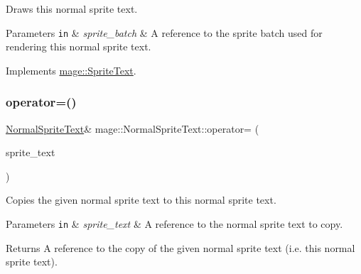 Draws this normal sprite text.


\begin{DoxyParams}[1]{Parameters}
\mbox{\tt in}  & {\em sprite\+\_\+batch} & A reference to the sprite batch used for rendering this normal sprite text. \\
\hline
\end{DoxyParams}


Implements \hyperlink{classmage_1_1_sprite_text_a45d5ac8410d5a46b26e8491946a2ad9e}{mage\+::\+Sprite\+Text}.

\hypertarget{classmage_1_1_normal_sprite_text_ab7dbd2e71dcaef5d6b7b767afa8d7094}{}\label{classmage_1_1_normal_sprite_text_ab7dbd2e71dcaef5d6b7b767afa8d7094} 
\subsubsection{\texorpdfstring{operator=()}{operator=()}\hspace{0.1cm}{\footnotesize\ttfamily [1/2]}}
{\footnotesize\ttfamily \hyperlink{classmage_1_1_normal_sprite_text}{Normal\+Sprite\+Text}\& mage\+::\+Normal\+Sprite\+Text\+::operator= (\begin{DoxyParamCaption}\item[{const \hyperlink{classmage_1_1_normal_sprite_text}{Normal\+Sprite\+Text} \&}]{sprite\+\_\+text }\end{DoxyParamCaption})\hspace{0.3cm}{\ttfamily [delete]}}

Copies the given normal sprite text to this normal sprite text.


\begin{DoxyParams}[1]{Parameters}
\mbox{\tt in}  & {\em sprite\+\_\+text} & A reference to the normal sprite text to copy. \\
\hline
\end{DoxyParams}
\begin{DoxyReturn}{Returns}
A reference to the copy of the given normal sprite text (i.\+e. this normal sprite text). 
\end{DoxyReturn}
\hypertarget{classmage_1_1_normal_sprite_text_a54cb023fad3b66dba35854ceaa50bc44}{}\label{classmage_1_1_normal_sprite_text_a54cb023fad3b66dba35854ceaa50bc44} 

